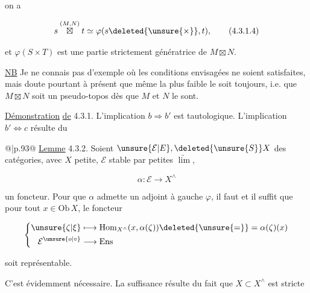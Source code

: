 
on a

\[
s\overset{(M,N)}{\boxtimes}t\simeq\varphi(s\deleted{\unsure{\times}},t),
\tag*{(4.3.1.4)}
\]


et $\varphi(S\times T)$   est une partie strictement génératrice de $M\boxtimes N$. 

\uline{NB} Je ne connais pas d'exemple où  les conditions envisagées ne soient satisfaites, mais doute pourtant à présent que même la plus faible le soit toujours, i.e. que $M\boxtimes N$ soit un pseudo-topos dès que $M$ et $N$ le sont.

\uline{Démonstration} \uline{de} 4.3.1. L'implication $b\Rightarrow b'$ est tautologique. L'implication $b'\Longleftrightarrow c$ résulte du

\noindent\begin{tabular}{@{}|p{.93\linewidth}@{}}
\uline{Lemme} 4.3.2. Soient $\unsure{\mathcal E|E},\deleted{\unsure{S}}X$ des catégories, avec $X$ petite, $\mathcal E$ stable par petites $\underrightarrow{\lim}$,

\[
\alpha:\mathcal E\longrightarrow X^\wedge
\]

un foncteur. Pour que $\alpha$ admette un adjoint à gauche $\varphi$, il faut et il suffit que pour tout $x\in\mathrm{Ob}\,X$, le foncteur

\[
\left\{\begin{aligned}
\unsure{\zeta|\xi}&\longmapsto \mathrm{Hom}_{X^\wedge}(x,\alpha(\zeta))\deleted{\unsure{=}}=\alpha(\zeta)(x)\\
\mathcal E^{\unsure{o|\circ}}&\longrightarrow\mathrm{Ens}
\end{aligned}\right.
\]

soit représentable.
\end{tabular}

C'est évidemment nécessaire. La suffisance résulte du  fait que $X\subset X^\wedge$ est stricte%
